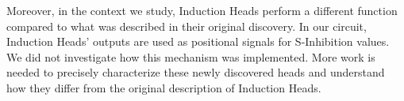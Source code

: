Moreover, in the context we study, Induction Heads perform a different function compared to what was described in their original discovery. In our circuit, Induction Heads' outputs are used as positional signals for S-Inhibition values. We did not investigate how this mechanism was implemented. More work is needed to precisely characterize these newly discovered heads and understand how they differ from the original description of Induction Heads.










